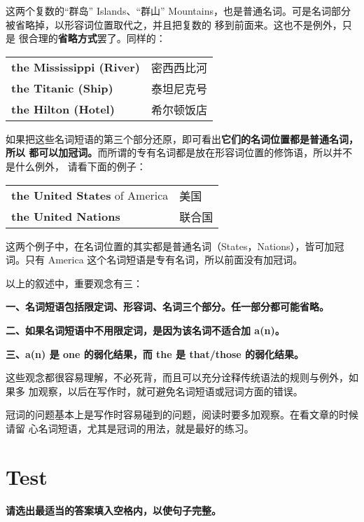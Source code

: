 \documentclass{yufa}
\begin{document}
这两个复数的“群岛” Islands、“群山” Mountains，也是普通名词。可是名词部分
被省略掉，以形容词位置取代之，并且把复数的  移到前面来。这也不是例外，只是
很合理的\textbf{省略方式}罢了。同样的：

\begin{longtable}[]{@{}ll@{}}
  \textbf{the Mississippi (River)} & 密西西比河 \\
  \textbf{the Titanic (Ship)} & 泰坦尼克号 \\
  \textbf{the Hilton (Hotel)} & 希尔顿饭店 \\
\end{longtable}

如果把这些名词短语的第三个部分还原，即可看出\textbf{它们的名词位置都是普通名词，所以
  都可以加冠词。}而所谓的专有名词都是放在形容词位置的修饰语，所以并不是什么例外，
请看下面的例子：

\begin{longtable}[]{@{}ll@{}}
  \textbf{the United States} of America& 美国 \\
  \textbf{the United Nations} & 联合国 \\
\end{longtable}

这两个例子中，在名词位置的其实都是普通名词（States，Nations），皆可加冠词。只有
America 这个名词短语是专有名词，所以前面没有加冠词。

以上的叙述中，重要观念有三：

\textbf{一、名词短语包括限定词、形容词、名词三个部分。任一部分都可能省略。}

\textbf{二、如果名词短语中不用限定词，是因为该名词不适合加 a(n)。}

\textbf{三、a(n) 是 one 的弱化结果，而 the 是 that/those 的弱化结果。}

这些观念都很容易理解，不必死背，而且可以充分诠释传统语法的规则与例外，如果多
加观察，以后在写作时，就可避免名词短语或冠词方面的错误。

冠词的问题基本上是写作时容易碰到的问题，阅读时要多加观察。在看文章的时候请留
心名词短语，尤其是冠词的用法，就是最好的练习。

\section{Test}


\textbf{请选出最适当的答案填入空格内，以使句子完整。}
\end{document}

